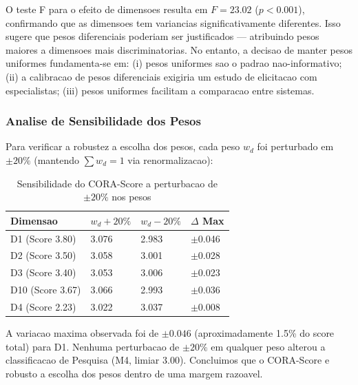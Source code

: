 O teste F para o efeito de dimensoes resulta em $F = 23.02$ ($p < 0.001$),
confirmando que as dimensoes tem variancias significativamente diferentes.
Isso sugere que pesos diferenciais poderiam ser justificados ---
atribuindo pesos maiores a dimensoes mais discriminatorias. No entanto,
a decisao de manter pesos uniformes fundamenta-se em: (i) pesos uniformes
sao o padrao nao-informativo; (ii) a calibracao de pesos diferenciais
exigiria um estudo de elicitacao com especialistas; (iii) pesos uniformes
facilitam a comparacao entre sistemas.

\subsubsection{Analise de Sensibilidade dos Pesos}

Para verificar a robustez a escolha dos pesos, cada peso $w_d$ foi
perturbado em $\pm 20\%$ (mantendo $\sum w_d = 1$ via renormalizacao):

\begin{table}[H]\centering\footnotesize
\caption{Sensibilidade do CORA-Score a perturbacao de $\pm 20\%$ nos pesos}
\label{tab:sensitivity}
\begin{tabular}{p{}p{}p{}p{}}
\toprule
\textbf{Dimensao} & $w_d + 20\%$ & $w_d - 20\%$ & $\Delta$ Max \\
\midrule
D1 (Score 3.80) & 3.076 & 2.983 & $\pm$0.046 \\
D2 (Score 3.50) & 3.058 & 3.001 & $\pm$0.028 \\
D3 (Score 3.40) & 3.053 & 3.006 & $\pm$0.023 \\
D10 (Score 3.67) & 3.066 & 2.993 & $\pm$0.036 \\
D4 (Score 2.23) & 3.022 & 3.037 & $\pm$0.008 \\
\bottomrule
\end{tabular}
\end{table}

A variacao maxima observada foi de $\pm 0.046$ (aproximadamente 1.5\% do
score total) para D1. Nenhuma perturbacao de $\pm 20\%$ em qualquer peso
alterou a classificacao de Pesquisa (M4, limiar 3.00). Concluimos que o
CORA-Score e robusto a escolha dos pesos dentro de uma margem razoavel.


